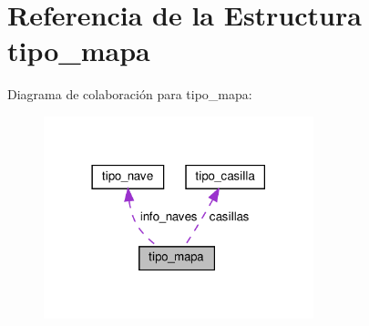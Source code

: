 \hypertarget{structtipo__mapa}{}\section{Referencia de la Estructura tipo\+\_\+mapa}
\label{structtipo__mapa}


Diagrama de colaboración para tipo\+\_\+mapa\+:\nopagebreak
\begin{figure}[H]
\begin{center}
\leavevmode
\includegraphics[width=222pt]{structtipo__mapa__coll__graph}
\end{center}
\end{figure}
